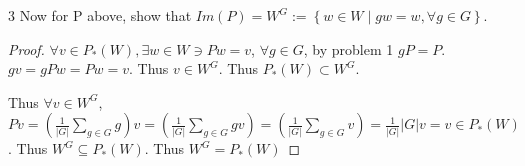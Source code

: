 \documentclass{article}
\begin{document}
\bigskip

\begin{claim}{3}\label{Claim 3.}
    Now for P above, show that $Im(P) = W^G := \left\{ w \in W \mid gw = w, \forall g \in G \right\}$. 
\end{claim}
\begin{proof}
    $\forall v \in P_*(W), \exists w \in W \ni Pw = v$, $\forall g \in G $, by problem 1 $gP = P$. $gv = gPw = Pw = v$. Thus $v \in W^G$. Thus $P_*(W) \subset W^G$. 
    
    Thus $\forall v \in W^G$, $Pv = (\frac{1}{|G|} \sum_{g \in G} g)v = (\frac{1}{|G|} \sum_{g \in G} gv) = (\frac{1}{|G|} \sum_{g \in G} v) = \frac{1}{|G|}|G| v = v \in P_*(W)$. Thus $W^G \subseteq P_*(W)$. Thus $W^G = P_*(W)$    
\end{proof}

\bigskip
\end{document}
